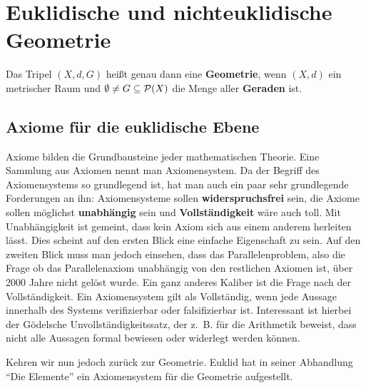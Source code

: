 \chapter{Euklidische und nichteuklidische Geometrie}

\begin{definition}%
    Das Tripel $(X, d, G)$ heißt genau dann eine \textbf{Geometrie},
    wenn $(X, d)$ ein metrischer Raum und $\emptyset \neq G \subseteq \mathcal{P}(X)$
    die Menge aller \textbf{Geraden} ist.
\end{definition}

\section{Axiome für die euklidische Ebene}
Axiome bilden die Grundbausteine jeder mathematischen Theorie. Eine
Sammlung aus Axiomen nennt man Axiomensystem.
Da der Begriff des Axiomensystems so grundlegend ist, hat man auch 
ein paar sehr grundlegende Forderungen an ihn: Axiomensysteme sollen
\textbf{widerspruchsfrei} sein, die Axiome sollen möglichst
\textbf{unabhängig} sein und \textbf{Vollständigkeit} wäre auch toll.
Mit Unabhängigkeit ist gemeint, dass kein Axiom sich aus einem anderem
herleiten lässt. Dies scheint auf den ersten Blick eine einfache
Eigenschaft zu sein. Auf den zweiten Blick muss man jedoch einsehen, 
dass das Parallelenproblem, also die Frage ob das Parallelenaxiom 
unabhängig von den restlichen Axiomen ist, über 2000 Jahre nicht 
gelöst wurde. Ein ganz anderes Kaliber ist die Frage nach der
Vollständigkeit. Ein Axiomensystem gilt als Vollständig, wenn
jede Aussage innerhalb des Systems verifizierbar oder falsifizierbar
ist. Interessant ist hierbei der Gödelsche Unvollständigkeitssatz, 
der z.~B. für die Arithmetik beweist, dass nicht alle Aussagen
formal bewiesen oder widerlegt werden können.

Kehren wir nun jedoch zurück zur Geometrie. Euklid hat in seiner 
Abhandlung \enquote{Die Elemente} ein Axiomensystem für die Geometrie
aufgestellt. 

